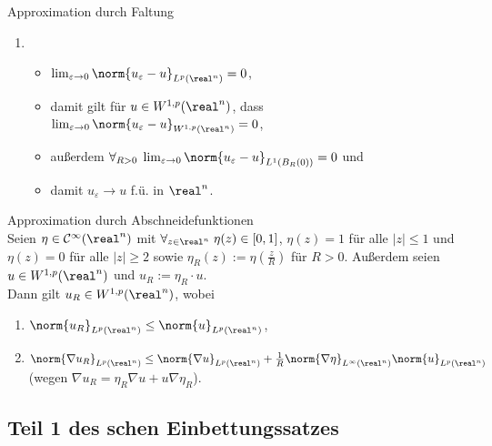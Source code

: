 \begin{Lemma}{Approximation durch Faltung}
\begin{enumerate}
        \item
        \begin{itemize}
            \item
            $\lim_{\varepsilon \to 0} \norm{u_\varepsilon - u}_{L^p(\real^n)} = 0$,

            \item
            damit gilt für $u \in W^{1,p}(\real^n)$, dass
            $\lim_{\varepsilon \to 0} \norm{u_\varepsilon - u}_{W^{1,p}(\real^n)} = 0$,

            \item
            außerdem $\forall_{R > 0}\; \lim_{\varepsilon \to 0}
            \norm{u_\varepsilon - u}_{L^1(B_R(0))} = 0$ und

            \item
            damit $u_\varepsilon \to u$ f.ü. in $\real^n$.
        \end{itemize}
    \end{enumerate}
\end{Lemma}

\begin{Lemma}{Approximation durch Abschneidefunktionen}\\
    Seien $\eta \in \C^\infty(\real^n)$ mit
    $\forall_{z \in \real^n}\; \eta(z) \in [0, 1]$,
    $\eta(z) = 1$ für alle $|z| \le 1$ und
    $\eta(z) = 0$ für alle $|z| \ge 2$
    sowie $\eta_R(z) := \eta(\frac{z}{R})$ für $R > 0$.
    Außerdem seien $u \in W^{1,p}(\real^n)$ und $u_R := \eta_R \cdot u$.\\
    Dann gilt $u_R \in W^{1,p}(\real^n)$, wobei
    \begin{enumerate}
        \item
        $\norm{u_R}_{L^p(\real^n)} \le \norm{u}_{L^p(\real^n)}$,

        \item
        $\norm{\nabla u_R}_{L^p(\real^n)} \le \norm{\nabla u}_{L^p(\real^n)} +
        \frac{1}{R} \norm{\nabla\eta}_{L^\infty(\real^n)} \norm{u}_{L^p(\real^n)}$
        (wegen $\nabla u_R = \eta_R \nabla u + u \nabla \eta_R$).
    \end{enumerate}
\end{Lemma}

\pagebreak

\subsection{%
    Teil 1 des schen Einbettungssatzes%
}

